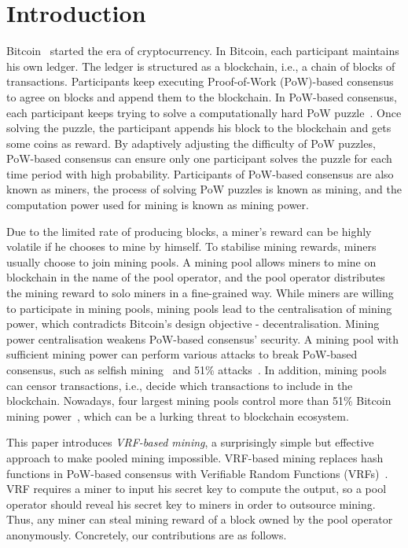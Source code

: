 \section{Introduction}
\label{sec:intro}

Bitcoin~\cite{nakamoto2008bitcoin} started the era of cryptocurrency.
In Bitcoin, each participant maintains his own ledger.
The ledger is structured as a blockchain, i.e., a chain of blocks of transactions.
Participants keep executing Proof-of-Work (PoW)-based consensus to agree on blocks and append them to the blockchain.
In PoW-based consensus, each participant keeps trying to solve a computationally hard PoW puzzle~\cite{dwork1992pricing}.
Once solving the puzzle, the participant appends his block to the blockchain and gets some coins as reward.
By adaptively adjusting the difficulty of PoW puzzles, PoW-based consensus can ensure only one participant solves the puzzle for each time period with high probability.
Participants of PoW-based consensus are also known as miners, the process of solving PoW puzzles is known as mining, and the computation power used for mining is known as mining power.

Due to the limited rate of producing blocks, a miner's reward can be highly volatile if he chooses to mine by himself.
To stabilise mining rewards, miners usually choose to join mining pools.
A mining pool allows miners to mine on blockchain in the name of the pool operator, and the pool operator distributes the mining reward to solo miners in a fine-grained way.
While miners are willing to participate in mining pools, mining pools lead to the centralisation of mining power, which contradicts Bitcoin's design objective - decentralisation.
Mining power centralisation weakens PoW-based consensus' security.
A mining pool with sufficient mining power can perform various attacks to break PoW-based consensus, such as selfish mining~\cite{eyal2018majority} and 51\% attacks~\cite{nakamoto2008bitcoin}.
In addition, mining pools can censor transactions, i.e., decide which transactions to include in the blockchain.
Nowadays, four largest mining pools control more than 51\% Bitcoin mining power~\cite{btc-com}, which can be a lurking threat to blockchain ecosystem.

This paper introduces \textit{VRF-based mining}, a surprisingly simple but effective approach to make pooled mining impossible.
VRF-based mining replaces hash functions in PoW-based consensus with Verifiable Random Functions (VRFs)~\cite{micali1999verifiable}.
VRF requires a miner to input his secret key to compute the output, so a pool operator should reveal his secret key to miners in order to outsource mining.
Thus, any miner can steal mining reward of a block owned by the pool operator anonymously.
Concretely, our contributions are as follows.

